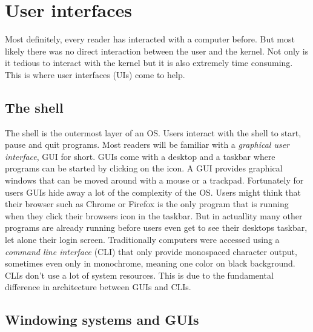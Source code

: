 \section{User interfaces}

Most definitely, every reader has interacted with a computer before. But most likely there was no
direct interaction between the user and the kernel. Not only is it tedious to interact with the kernel but
it is also extremely time consuming. This is where user interfaces (UIs) come to help.

\subsection{The shell}

The shell is the outermost layer of an OS. Users interact with the shell to start, pause and quit
programs. Most readers will be familiar with a \textit{graphical user interface}, GUI for short. GUIs come
with a desktop and a taskbar where programs can be started by clicking on the icon. A GUI provides
graphical windows that can be moved around with a mouse or a trackpad. Fortunately for users GUIs
hide away a lot of the complexity of the OS. Users might think that their browser such as Chrome or
Firefox is the only program that is running when they click their browsers icon in the taskbar. But
in actuallity many other programs are already running before users even get to see their desktops taskbar,
let alone their login screen. Traditionally computers were accessed using a \textit{command line interface}
(CLI) that only provide monospaced character output, sometimes even only in monochrome, meaning one
color on black background. CLIs don't use a lot of system resources. This is due to the fundamental
difference in architecture between GUIs and CLIs.

\subsection{Windowing systems and GUIs}

